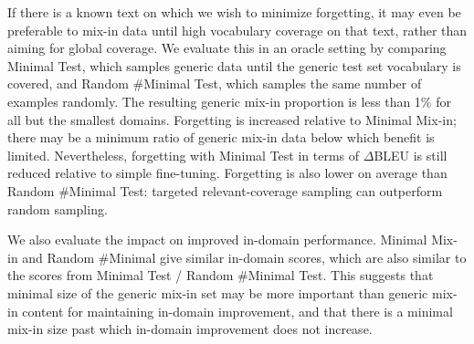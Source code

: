 \documentclass[11pt]{article}
\begin{document}
If there is a known text on which we wish to minimize forgetting, it may even be preferable to mix-in data until high vocabulary coverage on that text, rather than aiming for global coverage. We evaluate this  in an oracle setting by comparing Minimal Test, which samples generic data until the generic test set vocabulary is covered, and Random \#Minimal Test, which samples the same number of examples randomly. The resulting generic mix-in proportion is less than 1\% for all but the smallest domains. Forgetting is increased  relative to Minimal Mix-in; there may be a minimum ratio of generic mix-in data below which benefit is limited. Nevertheless, forgetting with Minimal Test in terms of $\Delta$BLEU is still reduced relative to simple fine-tuning. Forgetting is also lower on average than  Random \#Minimal Test: targeted relevant-coverage sampling can outperform random sampling.

We also evaluate the impact on improved in-domain performance. Minimal Mix-in and Random \#Minimal give similar in-domain scores, which are also similar to the scores from Minimal Test / Random \#Minimal Test. This suggests that minimal size of the generic mix-in set may be more important than generic mix-in content for maintaining  in-domain improvement, and that there is a minimal mix-in size past which in-domain improvement does not increase.
\end{document}
